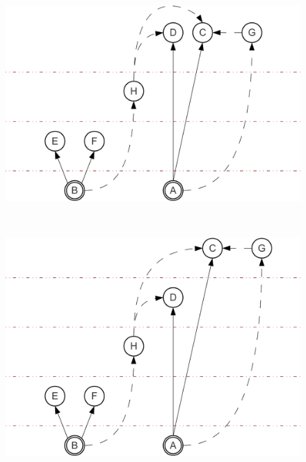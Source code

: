 \begin{figure}[t]
\begin{minipage}[b]{0.5\linewidth}
    \includegraphics[scale=0.4]{figures/complementation/steps-3-crop.pdf}
    \label{fig:multiple:steps:3}
  \end{minipage}
  \\
  \begin{minipage}[b]{0.5\linewidth}
    \centering
    \includegraphics[scale=0.4]{figures/complementation/steps-4-crop.pdf}
    \label{fig:multiple:steps:4}
  \end{minipage}
  \begin{minipage}[b]{0.5\linewidth}
    \centering

\end{minipage}
\end{figure}
